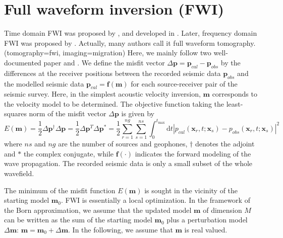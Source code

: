 \section{Full waveform inversion (FWI) }

Time domain FWI was proposed by \cite{tarantola1984inversion}, and developed in \cite{tarantola1986strategy,pica1990nonlinear}. Later, frequency domain FWI was proposed by \cite{pratt1998gauss}. Actually, many authors call it full waveform tomography. (tomography=fwi, imaging=migration) Here, we mainly follow two well-documented paper \cite{pratt1998gauss} and  \cite{virieux2009overview}. We define the misfit vector $\Delta \textbf{p}=\textbf{p}_{cal}-\textbf{p}_{obs}$ by the differences at the receiver positions between the recorded seismic data $\textbf{p}_{obs}$ and the modelled seismic data $\textbf{p}_{cal}=\textbf{f}(\textbf{m})$ for each source-receiver pair of the seismic survey. Here, in the simplest acoustic velocity inversion, $\textbf{m}$ corresponds to the velocity model to be determined. The objective function taking the least-squares norm of the misfit vector $\Delta \textbf{p}$ is given by
\begin{equation}\label{eq:obj}
E(\textbf{m})=\frac{1}{2}\Delta \textbf{p}^{\dagger}\Delta \textbf{p}
=\frac{1}{2}\Delta \textbf{p}^T\Delta \textbf{p}^*
=\frac{1}{2}\sum_{r=1}^{ng}\sum_{s=1}^{ns}\int_{0}^{t_{\max}}\mathrm{d}t|p_{cal}(\textbf{x}_r, t;\textbf{x}_s)-p_{obs}(\textbf{x}_r, t;\textbf{x}_s)|^2
\end{equation}
where $ns$ and $ng$ are the number of sources and geophones, $\dagger$ denotes the adjoint and $*$ the complex conjugate, while $\textbf{f}(\cdot)$ indicates the forward modeling of the wave propagation. The recorded seismic data is only a small subset of the whole wavefield.


The minimum of the misfit function $E(\textbf{m})$ is sought in the vicinity of the starting model $\textbf{m}_0$. FWI is essentially a local optimization.
In the framework of the Born approximation, we assume that the updated model $\textbf{m}$ of dimension $M$ can be written as the sum of the starting model $\textbf{m}_0$ plus a perturbation model $\Delta \textbf{m}$: $\textbf{m}=\textbf{m}_0+\Delta \textbf{m}$. In the following, we assume that $\textbf{m}$ is real valued.

